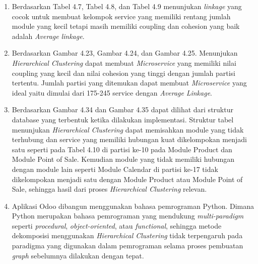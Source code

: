 \begin{enumerate}[nolistsep,leftmargin=0.5cm]
    \item Berdasarkan Tabel 4.7,  Tabel 4.8, dan Tabel 4.9 menunjukan \textit{linkage} yang cocok untuk membuat kelompok service yang memiliki rentang jumlah module yang kecil tetapi masih memiliki coupling dan cohesion yang baik adalah \textit{Average} \textit{linkage}.
    \item Berdasarkan Gambar 4.23, Gambar 4.24,  dan Gambar 4.25. Menunjukan \textit{Hierarchical Clustering} dapat membuat \textit{Microservice} yang memiliki nilai coupling yang kecil dan nilai cohesion yang tinggi dengan jumlah partisi tertentu. Jumlah partisi yang ditemukan dapat membuat \textit{Microservice} yang ideal yaitu dimulai dari 175-245 service dengan \textit{Average} \textit{Linkage}. 
    \item Berdasarkan Gambar 4.34  dan Gambar 4.35 dapat dilihat dari struktur database yang terbentuk ketika dilakukan implementasi. Struktur tabel menunjukan \textit{Hierarchical Clustering} dapat memisahkan module yang tidak terhubung dan service yang memiliki hubungan kuat dikelompokan menjadi satu seperti pada Tabel 4.10 di partisi ke-10 pada Module Product dan Module Point of Sale. Kemudian module yang tidak memiliki hubungan dengan module lain seperti Module Calendar di partisi ke-17 tidak dikelompokan menjadi satu dengan Module Product atau Module Point of Sale, sehingga hasil dari proses \textit{Hierarchical Clustering} relevan.
    \item Aplikasi Odoo dibangun menggunakan bahasa pemrograman Python. Dimana Python merupakan bahasa pemrograman yang mendukung  \textit{multi-paradigm} seperti \textit{procedural}, \textit{object-oriented}, atau \textit{functional}, sehingga  metode dekomposisi menggunakan \textit{Hierarchical Clustering} tidak terpengaruh pada paradigma yang digunakan dalam pemrograman selama proses pembuatan \textit{graph} sebelumnya dilakukan dengan tepat.\\ 
\end{enumerate}

\pagebreak


